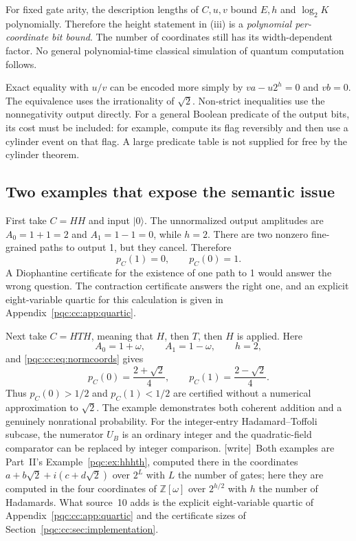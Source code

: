 \documentclass[11pt,letterpaper]{article}
\numberwithin{equation}{section}
\theoremstyle{definition}
\theoremstyle{remark}
\newcommand{\Z}{\mathbb Z}
\newcommand{\wtag}{\textup{[write]}}
\newcommand{\ket}[1]{\lvert #1\rangle}
\begin{document}
For fixed gate arity, the description lengths of $C,u,v$ bound $E,h$ and
$\log_2K$ polynomially. Therefore the height statement in (iii) is a
\emph{polynomial per-coordinate bit bound}. The number of coordinates still
has its width-dependent factor. No general polynomial-time classical simulation
of quantum computation follows.

Exact equality with $u/v$ can be encoded more simply by
$va-u2^h=0$ and $vb=0$. The equivalence uses the irrationality of $\sqrt2$.
Non-strict inequalities use the nonnegativity output directly. For a general
Boolean predicate of the output bits, its cost must be included: for example,
compute its flag reversibly and then use a cylinder event on that flag. A
large predicate table is not supplied for free by the cylinder theorem.

\subsection{Two examples that expose the semantic issue}

First take $C=HH$ and input $\ket0$. The unnormalized output amplitudes are
$A_0=1+1=2$ and $A_1=1-1=0$, while $h=2$. There are two nonzero fine-grained
paths to output 1, but they cancel. Therefore
\[
 p_C(1)=0,\qquad p_C(0)=1.
\]
A Diophantine certificate for the existence of one path to 1 would answer the
wrong question. The contraction certificate answers the right one, and an
explicit eight-variable quartic for this calculation is given in
Appendix~\ref{pqc:cc:app:quartic}.

Next take $C=HTH$, meaning that $H$, then $T$, then $H$ is applied. Here
\[
 A_0=1+\omega,\qquad A_1=1-\omega,\qquad h=2,
\]
and \eqref{pqc:cc:eq:normcoords} gives
\begin{equation}
 p_C(0)=\frac{2+\sqrt2}{4},\qquad
 p_C(1)=\frac{2-\sqrt2}{4}.
\label{pqc:cc:eq:hth}
\end{equation}
Thus $p_C(0)>1/2$ and $p_C(1)<1/2$ are certified without a numerical
approximation to $\sqrt2$. The example demonstrates both coherent addition
and a genuinely nonrational probability. For the integer-entry
Hadamard--Toffoli subcase, the numerator $U_B$ is an ordinary integer and the
quadratic-field comparator can be replaced by integer comparison. \wtag\ Both examples are Part~II's Example~\ref{pqc:ex:hhhth}, computed there in the coordinates $a+b\sqrt2+i(c+d\sqrt2)$ over $2^L$ with $L$ the number of gates; here they are computed in the four coordinates of $\Z[\omega]$ over $2^{h/2}$ with $h$ the number of Hadamards. What source~10 adds is the explicit eight-variable quartic of Appendix~\ref{pqc:cc:app:quartic} and the certificate sizes of Section~\ref{pqc:cc:sec:implementation}.
\end{document}
